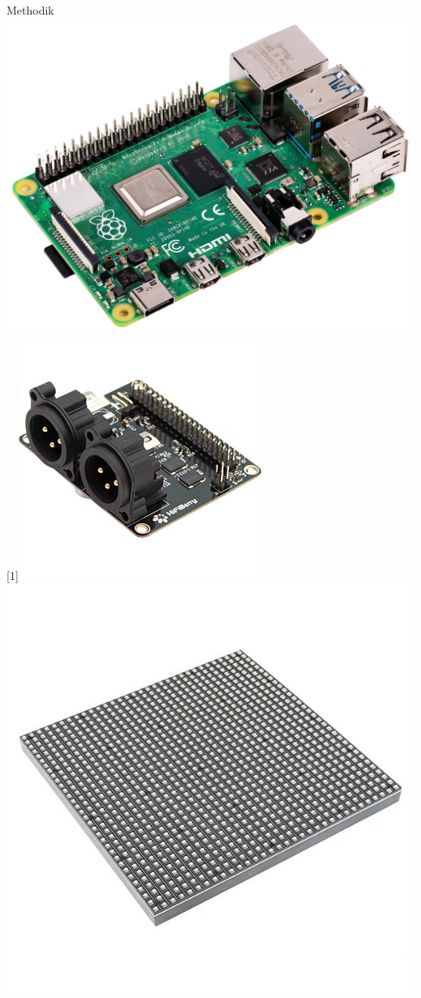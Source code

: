 \documentclass[Nike]{tuberlinbeamer}
\begin{document}
\begin{frame}{Methodik}
	\includegraphics[scale=0.05]{pictures/rpi}
	\scalebox{-1}[1]{\includegraphics[scale=0.3]{pictures/rpi-hat}}
	\includegraphics[scale=0.2]{pictures/led-matrix}

\end{frame}
\end{document}
